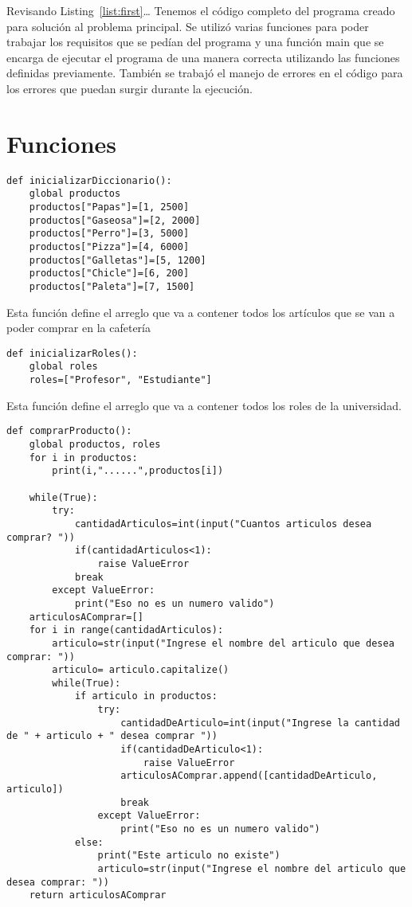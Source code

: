 \documentclass[a4paper,11pt]{article}
\theoremstyle{mytheor}
\begin{document}
Revisando Listing~\ref{list:first}\ldots{} 
Tenemos el código completo del programa creado para solución al problema principal. Se utilizó varias funciones para poder trabajar los requisitos que se pedían del programa y una función main que se encarga de ejecutar el programa de una manera correcta utilizando las funciones definidas previamente. También se trabajó el manejo de errores en el código para los errores que puedan surgir durante la ejecución.

\section*{Funciones}

\begin{lstlisting}[label={list:second},caption=inicializarDiccionario()]
def inicializarDiccionario():
    global productos
    productos["Papas"]=[1, 2500]
    productos["Gaseosa"]=[2, 2000]
    productos["Perro"]=[3, 5000]
    productos["Pizza"]=[4, 6000]
    productos["Galletas"]=[5, 1200]
    productos["Chicle"]=[6, 200]
    productos["Paleta"]=[7, 1500]
\end{lstlisting}

Esta función define el arreglo que va a contener todos los artículos que se van a poder comprar en la cafetería

\begin{lstlisting}[label={list:third},caption=inicializarRoles()]
def inicializarRoles():
    global roles
    roles=["Profesor", "Estudiante"]

\end{lstlisting}

Esta función define el arreglo que va a contener todos los roles de la universidad.

\begin{lstlisting}[label={list:fourth},caption=comprarProducto()]
def comprarProducto():
    global productos, roles
    for i in productos:
        print(i,"......",productos[i])
    
    while(True):
        try:
            cantidadArticulos=int(input("Cuantos articulos desea comprar? "))
            if(cantidadArticulos<1):
                raise ValueError
            break
        except ValueError:
            print("Eso no es un numero valido")
    articulosAComprar=[]
    for i in range(cantidadArticulos):
        articulo=str(input("Ingrese el nombre del articulo que desea comprar: "))
        articulo= articulo.capitalize()
        while(True):            
            if articulo in productos:
                try:
                    cantidadDeArticulo=int(input("Ingrese la cantidad de " + articulo + " desea comprar "))
                    if(cantidadDeArticulo<1):
                        raise ValueError
                    articulosAComprar.append([cantidadDeArticulo, articulo])
                    break
                except ValueError:
                    print("Eso no es un numero valido")
            else:
                print("Este articulo no existe")
                articulo=str(input("Ingrese el nombre del articulo que desea comprar: "))
    return articulosAComprar
    
\end{lstlisting}
\end{document}
